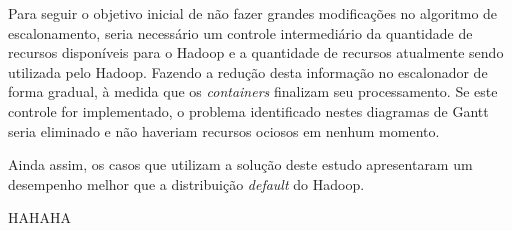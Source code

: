 Para seguir o objetivo inicial de não fazer grandes modificações no algoritmo de escalonamento, seria necessário um controle intermediário da quantidade de recursos disponíveis para o Hadoop e a quantidade de recursos atualmente sendo utilizada pelo Hadoop. Fazendo a redução desta informação no escalonador de forma gradual, à medida que os \textit{containers} finalizam seu processamento. Se este controle for implementado, o problema identificado nestes diagramas de Gantt seria eliminado e não haveriam recursos ociosos em nenhum momento.

Ainda assim, os casos que utilizam a solução deste estudo apresentaram um desempenho melhor que a distribuição \textit{default} do Hadoop.


HAHAHA


%
%
